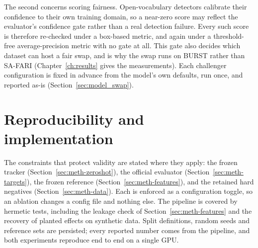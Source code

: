 The second concerns scoring fairness. Open-vocabulary detectors calibrate their confidence to their own
training domain, so a near-zero score may reflect the evaluator's confidence gate rather than a real detection
failure. Every such score is therefore re-checked under a box-based metric, and again under a threshold-free
average-precision metric with no gate at all. This gate also decides which dataset can host a fair swap, and
is why the swap runs on BURST rather than SA-FARI (Chapter~\ref{ch:results} gives the measurements). Each
challenger configuration is fixed in advance from the model's own defaults, run once, and reported as-is
(Section~\ref{sec:model_swap}).

\section{Reproducibility and implementation}
\label{sec:meth-repro}
The constraints that protect validity are stated where they apply: the frozen tracker
(Section~\ref{sec:meth-zeroshot}), the official evaluator (Section~\ref{sec:meth-targets}), the frozen
reference (Section~\ref{sec:meth-features}), and the retained hard negatives (Section~\ref{sec:meth-data}).
Each is enforced as a configuration toggle, so an ablation changes a config file and nothing else. The
pipeline is covered by hermetic tests, including the leakage check of Section~\ref{sec:meth-features} and
the recovery of planted effects on synthetic data. Split definitions,
random seeds and reference sets are persisted; every reported number comes from the pipeline, and both
experiments reproduce end to end on a single GPU.
